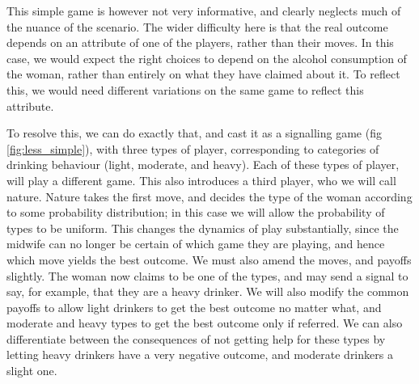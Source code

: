 This simple game is however not very informative, and clearly neglects much of the nuance of the scenario. The wider difficulty here is that the real outcome depends on an attribute of one of the players, rather than their moves. In this case, we would expect the right choices to depend on the alcohol consumption of the woman, rather than entirely on what they have claimed about it.
To reflect this, we would need different variations on the same game to reflect this attribute. 

To resolve this, we can do exactly that, and cast it as a signalling game (fig \ref{fig:less_simple}), with three types of player, corresponding to categories of drinking behaviour (light, moderate, and heavy). Each of these types of player, will play a different game. This also introduces a third player, who we will call nature. Nature takes the first move, and decides the type of the woman according to some probability distribution; in this case we will allow the probability of types to be uniform. 
This changes the dynamics of play substantially, since the midwife can no longer be certain of which game they are playing, and hence which move yields the best outcome. We must also amend the moves, and payoffs slightly. The woman now claims to be one of the types, and may send a signal to say, for example, that they are a heavy drinker. We will also modify the common payoffs to allow light drinkers to get the best outcome no matter what, and moderate and heavy types to get the best outcome only if referred. We can also differentiate between the consequences of not getting help for these types by letting heavy drinkers have a very negative outcome, and moderate drinkers a slight one.

